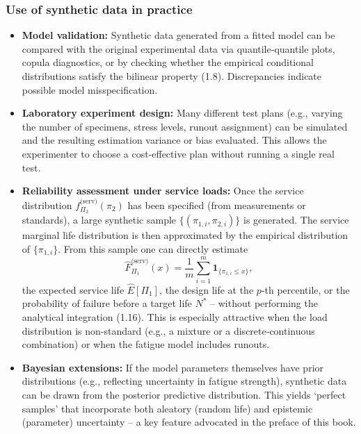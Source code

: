 \subsubsection{Use of synthetic data in practice}

\begin{itemize}
    \item \textbf{Model validation:} Synthetic data generated from a fitted model can be compared with the original experimental data via quantile‑quantile plots, copula diagnostics, or by checking whether the empirical conditional distributions satisfy the bilinear property (1.8). Discrepancies indicate possible model misspecification.

    \item \textbf{Laboratory experiment design:} Many different test plans (e.g., varying the number of specimens, stress levels, runout assignment) can be simulated and the resulting estimation variance or bias evaluated. This allows the experimenter to choose a cost‑effective plan without running a single real test.

    \item \textbf{Reliability assessment under service loads:} Once the service distribution \(f_{\Pi_2}^{\text{(serv)}}(\pi_2)\) has been specified (from measurements or standards), a large synthetic sample \(\{(\pi_{1,i},\pi_{2,i})\}\) is generated. The service marginal life distribution is then approximated by the empirical distribution of \(\{\pi_{1,i}\}\). From this sample one can directly estimate
    \[
    \widehat{F}_{\Pi_1}^{\text{(serv)}}(x)=\frac{1}{m}\sum_{i=1}^{m}\mathbf{1}_{\{\pi_{1,i}\le x\}},
    \]
    the expected service life \(\widehat{E}[\Pi_1]\), the design life at the \(p\)‑th percentile, or the probability of failure before a target life \(N^*\) – without performing the analytical integration (1.16). This is especially attractive when the load distribution is non‑standard (e.g., a mixture or a discrete‑continuous combination) or when the fatigue model includes runouts.

    \item \textbf{Bayesian extensions:} If the model parameters themselves have prior distributions (e.g., reflecting uncertainty in fatigue strength), synthetic data can be drawn from the posterior predictive distribution. This yields ‘perfect samples’ that incorporate both aleatory (random life) and epistemic (parameter) uncertainty – a key feature advocated in the preface of this book.
\end{itemize}

